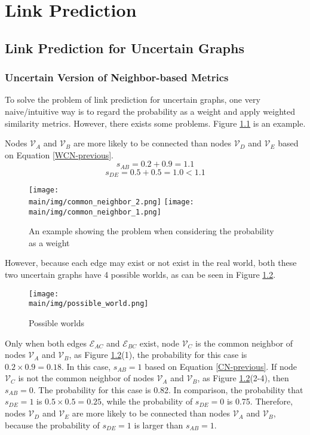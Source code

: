 \documentclass[\main/thesis.tex]{subfiles}
\begin{document}
\chapter{Link Prediction}
\section{Link Prediction for Uncertain Graphs}
\subsection{Uncertain Version of Neighbor-based Metrics}
To solve the problem of link prediction for uncertain graphs, one very naive/intuitive way is to regard the probability as a weight and apply weighted similarity metrics. However, there exists some problems. Figure \ref{problem-consider-probability-as-weight-link} is an example.

Nodes $\mathcal{V}_A$ and $\mathcal{V}_B$ are more likely to be connected than nodes $\mathcal{V}_D$ and $\mathcal{V}_E$ based on Equation \ref{WCN-previous}.
\begin{equation}
s_{AB} = 0.2 + 0.9 = 1.1
\end{equation}
\begin{equation}
s_{DE} = 0.5 + 0.5 = 1.0 < 1.1
\end{equation}

\begin{figure}
\texttt{[image: \\main/img/common\_neighbor\_2.png]}
\texttt{[image: \\main/img/common\_neighbor\_1.png]}
\centering
\caption{An example showing the problem when considering the probability as a weight}
\label{problem-consider-probability-as-weight-link}
\end{figure}

However, because each edge may exist or not exist in the real world, both these two uncertain graphs have 4 possible worlds, as can be seen in Figure \ref{possible-world-link}.

\begin{figure}
\texttt{[image: \\main/img/possible\_world.png]}
\centering
\caption{Possible worlds}
\label{possible-world-link}
\end{figure}

Only when both edges $\mathcal{E}_{AC}$ and $\mathcal{E}_{BC}$ exist, node $\mathcal{V}_C$ is the common neighbor of nodes $\mathcal{V}_A$ and $\mathcal{V}_B$, as Figure \ref{possible-world-link}(1), the probability for this case is $0.2\times 0.9=0.18$. In this case, $s_{AB}=1$ based on Equation \ref{CN-previous}. If node $\mathcal{V}_C$ is not the common neighbor of nodes $\mathcal{V}_A$ and $\mathcal{V}_B$, as Figure \ref{possible-world-link}(2-4),  then $s_{AB}=0$. The probability for this case is 0.82. In comparison, the probability that $s_{DE}=1$ is $0.5\times 0.5=0.25$, while the probability of $s_{DE}=0$ is 0.75. Therefore, nodes $\mathcal{V}_D$ and $\mathcal{V}_E$ are more likely to be connected than nodes $\mathcal{V}_A$ and $\mathcal{V}_B$, because the probability of $s_{DE}=1$ is larger than $s_{AB}=1$. 
\end{document}
